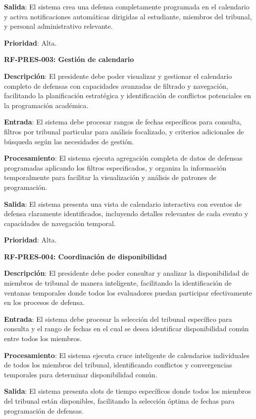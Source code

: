 \documentclass[12pt,a4paper,oneside]{report}
\begin{document}
\textbf{Salida}: El sistema crea una defensa completamente programada en el calendario y activa notificaciones automáticas dirigidas al estudiante, miembros del tribunal, y personal administrativo relevante.

\textbf{Prioridad}: Alta.

\textbf{RF-PRES-003: Gestión de calendario}

\textbf{Descripción}: El presidente debe poder visualizar y gestionar el calendario completo de defensas con capacidades avanzadas de filtrado y navegación, facilitando la planificación estratégica y identificación de conflictos potenciales en la programación académica.

\textbf{Entrada}: El sistema debe procesar rangos de fechas específicos para consulta, filtros por tribunal particular para análisis focalizado, y criterios adicionales de búsqueda según las necesidades de gestión.

\textbf{Procesamiento}: El sistema ejecuta agregación completa de datos de defensas programadas aplicando los filtros especificados, y organiza la información temporalmente para facilitar la visualización y análisis de patrones de programación.

\textbf{Salida}: El sistema presenta una vista de calendario interactiva con eventos de defensa claramente identificados, incluyendo detalles relevantes de cada evento y capacidades de navegación temporal.

\textbf{Prioridad}: Alta.

\textbf{RF-PRES-004: Coordinación de disponibilidad}

\textbf{Descripción}: El presidente debe poder consultar y analizar la disponibilidad de miembros de tribunal de manera inteligente, facilitando la identificación de ventanas temporales donde todos los evaluadores puedan participar efectivamente en los procesos de defensa.

\textbf{Entrada}: El sistema debe procesar la selección del tribunal específico para consulta y el rango de fechas en el cual se desea identificar disponibilidad común entre todos los miembros.

\textbf{Procesamiento}: El sistema ejecuta cruce inteligente de calendarios individuales de todos los miembros del tribunal, identificando conflictos y convergencias temporales para determinar disponibilidad común.

\textbf{Salida}: El sistema presenta slots de tiempo específicos donde todos los miembros del tribunal están disponibles, facilitando la selección óptima de fechas para programación de defensas.
\end{document}
